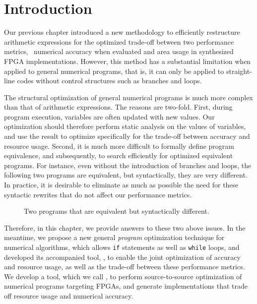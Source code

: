 \section{Introduction}

Our previous chapter introduced a new methodology to efficiently restructure
arithmetic expressions for the optimized trade-off between two performance
metrics, \ie~numerical accuracy when evaluated and area usage in synthesized
FPGA implementations.  However, this method has a substantial limitation when
applied to general numerical programs, that is, it can only be applied to
straight-line codes without control structures such as branches and loops.

The structural optimization of general numerical programs is much more complex
than that of arithmetic expressions.  The reasons are two-fold.  First,
during program execution, variables are often updated with new values.  Our
optimization should therefore perform static analysis on the values of
variables, and use the result to optimize specifically for the trade-off
between accuracy and resource usage.  Second, it is much more difficult to
formally define program equivalence, and subsequently, to search efficiently
for optimized equivalent programs.  For instance, even without the introduction
of branches and loops, the following two programs are equivalent, but
syntactically, they are very different.  In practice, it is desirable to
eliminate as much as possible the need for these syntactic rewrites that do not
affect our performance metrics.

\begin{figure}[ht]
    \centering
     \qquad \qquad
    \caption{Two programs that are equivalent but syntactically different.}
    \label{fig:equiv_progs}
\end{figure}

Therefore, in this chapter, we provide answers to these two above issues.  In
the meantime, we propose a new general \emph{program} optimization technique
for numerical algorithms, which allows \texttt{if} statements as well as
\texttt{while} loops, and developed its accompanied tool, \newsoap, to enable
the joint optimization of accuracy and resource usage, as well as the trade-off
between these performance metrics.  We develop a tool, which we call \newsoap,
to perform source-to-source optimization of numerical programs targeting FPGAs,
and generate implementations that trade off resource usage and numerical
accuracy.


